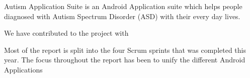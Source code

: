 
\giraf Autism Application Suite is an Android Application suite which helps people diagnosed with Autism Spectrum Disorder (ASD) with their every day lives. 

We have contributed to the project with   


Most of the report is split into the four Scrum sprints that was completed this year. The focus throughout the report has been to unify the different Android Applications    
